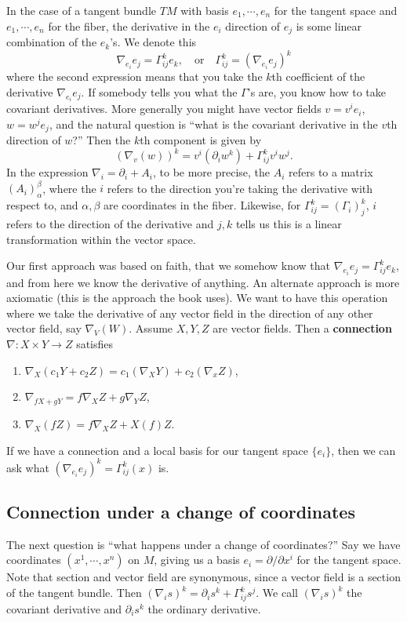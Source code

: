 In the case of a tangent bundle $TM$ with basis $e_1,\cdots ,e_n $ for the tangent space and $e_1,\cdots ,e_n $ for the fiber, the derivative in the $e_i $ direction of $e_j $ is some linear combination of the $e_k$'s. We denote this \[
    \nabla _{e_i }e_j =\Gamma _{ij}^k e_k, \quad \text{or} \quad \Gamma _{ij}^k=\left( \nabla_{e_i }e_j  \right) ^k
\] where the second expression means that you take the $k$th coefficient of the derivative $\nabla_{e_i }e_j $. If somebody tells you what the $\Gamma $'s are, you know how to take covariant derivatives. More generally you might have vector fields $v=v^i e_i $, $w=w^j e_j $, and the natural question is ``what is the covariant derivative in the $v$th direction of $w$?'' Then the $k$th component is given by \[
\boxed{ \left( \nabla _v(w) \right) ^k=v^i (\partial _i w^k)+\Gamma _{ij}^k v^i w^j .}
\] In the expression $\nabla_i =\partial _i +A_i $, to be more precise, the $A_i $ refers to a matrix $(A_i )^{\beta }_{\alpha }$, where the $i$ refers to the direction you're taking the derivative with respect to, and $\alpha ,\beta $ are coordinates in the fiber. Likewise, for $\Gamma _{ij}^k=(\Gamma _i)_j ^k $, $i$ refers to the direction of the derivative and $j,k$ tells us this is a linear transformation within the vector space.

Our first approach was based on faith, that we somehow know that $\nabla_{e_i }e_j =\Gamma _{ij}^ke_k$, and from here we know the derivative of anything. An alternate approach is more axiomatic (this is the approach the book uses). We want to have this operation where we take the derivative of any vector field in the direction of any other vector field, say $\nabla_V(W)$. Assume $X,Y,Z$ are vector fields. Then a \textbf{connection} $\nabla \colon X \times Y\to Z$ satisfies
\begin{enumerate}[label=(\arabic*)]
    \item $\nabla_X(c_1Y+c_2Z)=c_1(\nabla_X Y)+c_2(\nabla_x Z)$,
    \item $\nabla _{fX+gY}=f\nabla_XZ+g\nabla_YZ$,
    \item $\nabla_X(fZ)=f\nabla_XZ+X(f)Z$.
\end{enumerate}
If we have a connection and a local basis for our tangent space $\{e_i \} $, then we can ask what $\left( \nabla_{e_i }e_j  \right) ^k=\Gamma_{ij}^k(x)$ is. 

\subsection{Connection under a change of coordinates}
The next question is ``what happens under a change of coordinates?'' Say we have coordinates $(x^1,\cdots ,x^n )$ on $M$, giving us a basis $e_i =\partial /\partial x^i $ for the tangent space. Note that section and vector field are synonymous, since a vector field is a section of the tangent bundle. Then $(\nabla _i s)^k=\partial _i s^k+\Gamma _{ij}^k s^j $. We call $(\nabla _i  s)^k$ the covariant derivative and $\partial _i s^k$ the ordinary derivative. 

